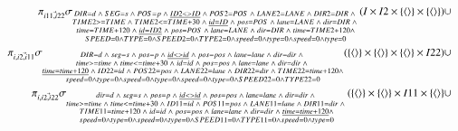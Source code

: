 \begin{eqnarray*}
&& \pi_{\vec{i11, i22}}\sigma_{\substack{DIR = d \;\wedge\; SEG = s \;\wedge\; POS = p \;\wedge\; \underline{ ID2 <> ID} \;\wedge\; POS2 = POS \;\wedge\; LANE2 = LANE \;\wedge\; DIR2 = DIR \;\wedge\; \\ TIME2 >= TIME \;\wedge\; TIME2 <= TIME + 30 \;\wedge\; \underline{id = ID} \;\wedge\; pos = POS \;\wedge\;  lane = LANE \;\wedge\; dir=DIR \;\wedge\; \\time = TIME + 120 \;\wedge\; \underline{id = ID2} \;\wedge\; pos = POS \;\wedge\;  lane = LANE \;\wedge\; dir = DIR \;\wedge\; time = TIME2 + 120 \wedge \\SPEED = 0 \wedge TYPE = 0 \wedge SPEED2 = 0 \wedge TYPE2 = 0 \wedge  speed = 0 \wedge type = 0 \wedge speed = 0 \wedge type =0 }}(I \times I2 \times \{\tuple{} \} \times  \{\tuple{} \}) \cup \\
%
&& \pi_{\vec{i, i2, i11}}\sigma_{\substack{DIR = d \;\wedge\; seg = s \;\wedge\; pos = p \;\wedge\; \underline {id <> id} \;\wedge\; pos = pos \;\wedge\; lane = lane \;\wedge\; dir = dir \;\wedge\; \\ time >= time \;\wedge\; time <= time + 30 \;\wedge\; id = id \;\wedge\; pos = pos \;\wedge\;  lane = lane \;\wedge\; dir=dir \;\wedge\; \\\underline {time = time + 120} \;\wedge\; ID22 = id \;\wedge\; POS22 = pos \;\wedge\;  LANE22 = lane \;\wedge\; DIR22 = dir \;\wedge\; TIME22 = time + 120 \wedge \\speed = 0 \wedge type = 0 \wedge speed = 0 \wedge type = 0 \wedge  speed = 0 \wedge type = 0 \wedge SPEED22 = 0 \wedge TYPE22 =0 }}( \{\tuple{} \} \times \{\tuple{} \}\times  \{\tuple{} \} \times I22) \cup \\
&& \pi_{\vec{i, i2, i22}}\sigma_{\substack{dir = d \;\wedge\; seg = s \;\wedge\; pos = p \;\wedge\; \underline {id <> id} \;\wedge\; pos = pos \;\wedge\; lane = lane \;\wedge\; dir = dir \;\wedge\; \\ time >= time \;\wedge\; time <= time + 30 \;\wedge\; ID11 = id \;\wedge\; POS11 = pos \;\wedge\;  LANE11 = lane \;\wedge\; DIR11=dir \;\wedge\; \\TIME11 = time + 120 \;\wedge\; id = id \;\wedge\; pos = pos \;\wedge\;  lane = lane \;\wedge\; dir = dir \;\wedge\; \underline {time = time + 120} \wedge \\speed = 0 \wedge type = 0 \wedge speed = 0 \wedge type = 0 \wedge  SPEED11 = 0 \wedge TYPE11 = 0 \wedge speed = 0 \wedge type =0 }}(\{\tuple{} \} \times \{\tuple{} \} \times I11 \times \{\tuple{}\} \cup \\

\end{eqnarray*}
